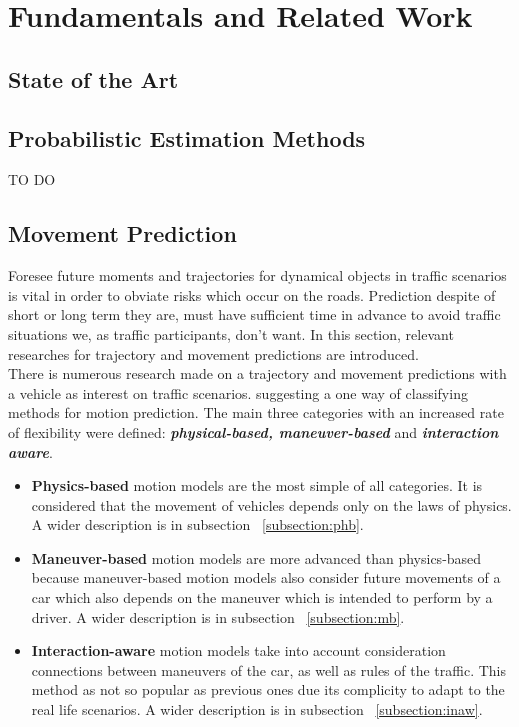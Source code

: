 \chapter{Fundamentals and Related Work}
\label{chap:1}
%
\section{State of the Art}

\section{Probabilistic Estimation Methods}

TO DO

\section{Movement Prediction}

Foresee future moments and trajectories for dynamical objects in traffic scenarios is vital in order to obviate risks which occur on the roads. Prediction despite of short or long term they are, must have sufficient time in advance to avoid traffic situations we, as traffic participants, don't want. In this section, relevant researches for trajectory and movement predictions are introduced. \\

There is numerous research made on a trajectory and movement predictions with a vehicle as interest on traffic scenarios. \cite{ClassificationI} suggesting a one way of classifying methods for motion prediction. The main three categories with an increased rate of flexibility were defined: \textbf{\textit{physical-based, maneuver-based}} and \textbf{\textit{interaction aware}}.

\begin{itemize}
	\item \textbf{Physics-based} motion models are the most simple of all categories. It is considered that the movement of vehicles depends only on the laws of physics. A wider description is in subsection ~\ref{subsection:phb}.
	\item \textbf{Maneuver-based} motion models are more advanced than physics-based because maneuver-based motion models also consider future movements of a car which also depends on the maneuver which is intended to perform by a driver. A wider description is in subsection ~\ref{subsection:mb}.
	\item \textbf{Interaction-aware} motion models take into account consideration connections between maneuvers of the car, as well as rules of the traffic. This method as not so popular as previous ones due its complicity to adapt to the real life scenarios. A wider description is in subsection ~\ref{subsection:inaw}.
\end{itemize}


